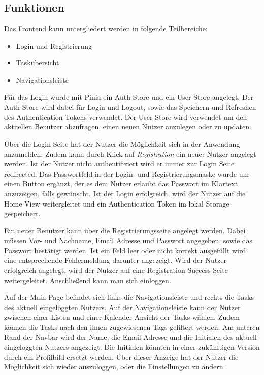 \documentclass[a4paper, 12pt]{article}
\begin{document}
    \subsection{Funktionen}
    Das Frontend kann untergliedert werden in folgende Teilbereiche:

    \begin{itemize}
        \item Login und Registrierung
        \item Taskübersicht
        \item Navigationsleiste
    \end{itemize}

    Für das Login wurde mit Pinia ein Auth Store und ein User Store angelegt. Der Auth Store wird dabei für Login und Logout, sowie das Speichern und Refreshen des Authentication Tokens verwendet.
    Der User Store wird verwendet um den aktuellen Benutzer abzufragen, einen neuen Nutzer anzulegen oder zu updaten.
    
    Über die Login Seite hat der Nutzer die Möglichkeit sich in der Anwendung anzumelden. Zudem kann durch Klick auf {\it Registration} ein neuer Nutzer angelegt werden. Ist der Nutzer nicht authentifiziert wird
    er immer zur Login Seite redirected. Das Passwortfeld in der Login- und Registrierungsmaske wurde um einen Button ergänzt, der es dem Nutzer erlaubt das Passwort im Klartext anzuzeigen, falls gewünscht.
    Ist der Login erfolgreich, wird der Nutzer auf die Home View weitergleitet und ein Authentication Token im lokal Storage gespeichert.

    Ein neuer Benutzer kann über die Registrierungsseite angelegt werden. Dabei müssen Vor- und Nachname, Email Adresse und Passwort angegeben, sowie das Passwort bestätigt werden. Ist ein Feld leer oder nicht korrekt ausgefüllt
    wird eine entsprechende Fehlermeldung darunter angezeigt. Wird der Nutzer erfolgreich angelegt, wird der Nutzer auf eine Registration Success Seite weitergeleitet. Anschließend kann man sich einloggen.

    Auf der Main Page befindet sich links die Navigationsleiste und rechts die Tasks des aktuell eingeloggten Nutzers. Auf der Navigationsleiste kann der Nutzer zwischen einer Listen und einer Kalender Ansicht der Tasks wählen.
    Zudem können die Tasks nach den ihnen zugewiesenen Tags gefiltert werden. Am unteren Rand der Navbar wird der Name, die Email Adresse und die Initialen des aktuell eingeloggten Nutzers angezeigt.
    Die Initialen könnten in einer zukünftigen Version durch ein Profilbild ersetzt werden.
    Über dieser Anzeige hat der Nutzer die Möglichkeit sich wieder auszuloggen, oder die Einstellungen zu ändern.
\end{document}
